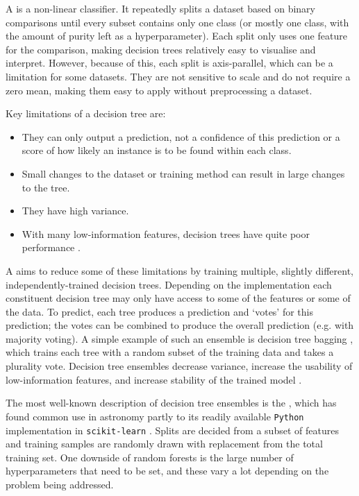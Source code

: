         A  is a non-linear classifier. It repeatedly splits a dataset based on binary comparisons until every subset contains only one class (or mostly one class, with the amount of purity left as a hyperparameter). Each split only uses one feature for the comparison, making decision trees relatively easy to visualise and interpret. However, because of this, each split is axis-parallel, which can be a limitation for some datasets. They are not sensitive to scale and do not require a zero mean, making them easy to apply without preprocessing a dataset.

        Key limitations of a decision tree are:
        \begin{itemize}
            \item They can only output a prediction, not a confidence of this prediction or a score of how likely an instance is to be found within each class.
            \item Small changes to the dataset or training method can result in large changes to the tree.
            \item They have high variance.
            \item With many low-information features, decision trees have quite poor performance \citep{breiman01random-forest}.
        \end{itemize}

        A  aims to reduce some of these limitations by training multiple, slightly different, independently-trained decision trees. Depending on the implementation each constituent decision tree may only have access to some of the features or some of the data. To predict, each tree produces a prediction and `votes' for this prediction; the votes can be combined to produce the overall prediction (e.g. with majority voting). A simple example of such an ensemble is decision tree bagging \citep{breiman_bagging_1996}, which trains each tree with a random subset of the training data and takes a plurality vote. Decision tree ensembles decrease variance, increase the usability of low-information features, and increase stability of the trained model \citep{breiman01random-forest}.

        The most well-known description of decision tree ensembles is the  \citep{breiman01random-forest}, which has found common use in astronomy partly to its readily available \texttt{Python} implementation in \texttt{scikit-learn} \citep{scikit-learn}. Splits are decided from a subset of features and training samples are randomly drawn with replacement from the total training set. One downside of random forests is the large number of hyperparameters that need to be set, and these vary a lot depending on the problem being addressed.

